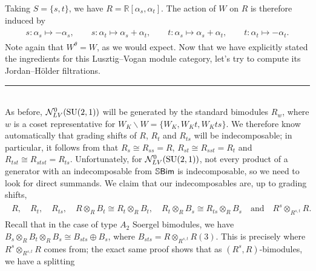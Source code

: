 \begin{example}
\begin{align*}
\begin{split}
\end{split}
\end{align*}
\noindent Taking $S = \{s, t\}$, we have $R = \mathbb{R}[\alpha_s, \alpha_t]$. The action of $W$ on $R$ is therefore induced by
\begin{align*}
\begin{split}
s : \alpha_s \mapsto -\alpha_s,\qquad s : \alpha_t \mapsto \alpha_s + \alpha_t,\qquad t : \alpha_s \mapsto \alpha_s + \alpha_t,\qquad t : \alpha_t \mapsto -\alpha_t.
\end{split}
\end{align*}
\noindent Note again that $W^\theta = W$, as we would expect. Now that we have explicitly stated the ingredients for this Lusztig--Vogan module category, let's try to compute its Jordan--H\"{o}lder filtrations.\\[-1.5\baselineskip]
\begin{center}
\rule{0.5\linewidth}{1pt}
\end{center}
\noindent\\[-\baselineskip]
\noindent As before, $\mathcal{N}_{LV}^0(\textup{SU}(2, 1))$ will be generated by the standard bimodules $R_w$, where $w$ is a coset representative for $W_K\backslash W = \{W_K, W_Kt, W_Kts\}$. We therefore know automatically that grading shifts of $R$, $R_t$ and $R_{ts}$ will be indecomposable; in particular, it follows from \cite[Lemma 6.2.3]{LR22} that $R_s \cong R_{ss} = R$, $R_{st} \cong R_{sst} = R_t$ and $R_{tst} \cong R_{stst} = R_{ts}$. Unfortunately, for $\mathcal{N}_{LV}^0(\textup{SU}(2, 1))$, not every product of a generator with an indecomposable from $\mathbb{S}\textnormal{\textsf{Bim}}$ is indecomposable, so we need to look for direct summands. We claim that our indecomposables are, up to grading shifts,
\begin{align*}
\begin{split}
R,\quad R_t,\quad R_{ts},\quad R \otimes_R B_t \cong R_t \otimes_R B_t,\quad R_t \otimes_R B_s \cong R_{ts} \otimes_R B_s\quad\text{and}\quad R^s \otimes_{R^{s,t}} R.
\end{split}
\end{align*}
\noindent Recall that in the case of type $A_2$ Soergel bimodules, we have $B_s \otimes_R B_t \otimes_R B_s \cong B_{sts} \oplus B_s$, where $B_{sts} = R \otimes_{R^{s,t}} R(3)$. This is precisely where $R^s \otimes_{R^{s,t}} R$ comes from; the exact same proof shows that as $(R^s, R)$-bimodules, we have a splitting

\end{example}
